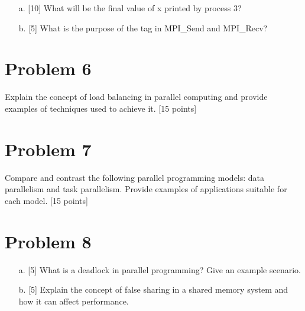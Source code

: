 \documentclass{article}
\begin{document}
\begin{enumerate}
    \item[a.] [10] What will be the final value of x printed by process 3?
    \item[b.] [5]  What is the purpose of the tag in MPI\_Send and MPI\_Recv?
\end{enumerate}

\section*{Problem 6}
Explain the concept of load balancing in parallel computing and provide examples of techniques used to achieve it. [15 points]

\section*{Problem 7}
Compare and contrast the following parallel programming models: data parallelism and task parallelism.  Provide examples of applications suitable for each model. [15 points]

\section*{Problem 8}
\begin{enumerate}
    \item[a.] [5] What is a deadlock in parallel programming? Give an example scenario.
    \item[b.] [5] Explain the concept of false sharing in a shared memory system and how it can affect performance.
\end{enumerate}
\end{document}
